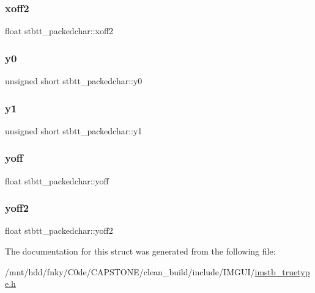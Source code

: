 \subsubsection{\texorpdfstring{xoff2}{xoff2}}
{\footnotesize\ttfamily float stbtt\+\_\+packedchar\+::xoff2}

\mbox{\label{structstbtt__packedchar_a43429c9545ca8ccf14012cedcf83c1a7}} 
\subsubsection{\texorpdfstring{y0}{y0}}
{\footnotesize\ttfamily unsigned short stbtt\+\_\+packedchar\+::y0}

\mbox{\label{structstbtt__packedchar_a9569073ba79fad355210b6ffc35905a7}} 
\subsubsection{\texorpdfstring{y1}{y1}}
{\footnotesize\ttfamily unsigned short stbtt\+\_\+packedchar\+::y1}

\mbox{\label{structstbtt__packedchar_a6f342ae10df5319f4999ffd256567142}} 
\subsubsection{\texorpdfstring{yoff}{yoff}}
{\footnotesize\ttfamily float stbtt\+\_\+packedchar\+::yoff}

\mbox{\label{structstbtt__packedchar_a2ec5bbd1010c9a9b7cbdeb7503dcaffa}} 
\subsubsection{\texorpdfstring{yoff2}{yoff2}}
{\footnotesize\ttfamily float stbtt\+\_\+packedchar\+::yoff2}



The documentation for this struct was generated from the following file\+:\begin{DoxyCompactItemize}
\item 
/mnt/hdd/fnky/\+C0de/\+C\+A\+P\+S\+T\+O\+N\+E/clean\+\_\+build/include/\+I\+M\+G\+U\+I/\hyperlink{imstb__truetype_8h}{imstb\+\_\+truetype.\+h}\end{DoxyCompactItemize}
